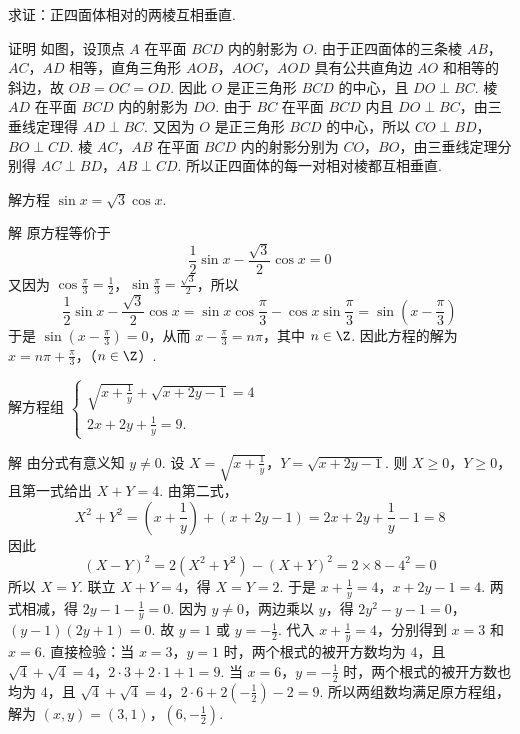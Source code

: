 \begin{problem}
求证：正四面体相对的两棱互相垂直.
\end{problem}

\begin{solution}
证明 如图，设顶点 \(A\) 在平面 \(BCD\) 内的射影为 \(O\). 由于正四面体的三条棱 \(AB\)，\(AC\)，\(AD\) 相等，直角三角形 \(AOB\)，\(AOC\)，\(AOD\) 具有公共直角边 \(AO\) 和相等的斜边，故 \(OB=OC=OD\). 因此 \(O\) 是正三角形 \(BCD\) 的中心，且 \(DO\perp BC\). 棱 \(AD\) 在平面 \(BCD\) 内的射影为 \(DO\).
由于 \(BC\) 在平面 \(BCD\) 内且 \(DO\perp BC\)，由三垂线定理得 \(AD\perp BC\). 又因为 \(O\) 是正三角形 \(BCD\) 的中心，所以 \(CO\perp BD\)，\(BO\perp CD\). 棱 \(AC\)，\(AB\) 在平面 \(BCD\) 内的射影分别为 \(CO\)，\(BO\)，由三垂线定理分别得 \(AC\perp BD\)，\(AB\perp CD\). 所以正四面体的每一对相对棱都互相垂直.
\end{solution}


\begin{problem}
解方程 \(\sin x=\sqrt{3}\cos x\).
\end{problem}

\begin{solution}
解 原方程等价于
\[
\frac{1}{2}\sin x-\frac{\sqrt{3}}{2}\cos x=0
\]
又因为 \(\cos\frac{\pi}{3}=\frac{1}{2}\)，\(\sin\frac{\pi}{3}=\frac{\sqrt{3}}{2}\)，所以
\[
\frac{1}{2}\sin x-\frac{\sqrt{3}}{2}\cos x
=\sin x\cos\frac{\pi}{3}-\cos x\sin\frac{\pi}{3}
=\sin\left(x-\frac{\pi}{3}\right)
\]
于是 \(\sin\left(x-\frac{\pi}{3}\right)=0\)，从而 \(x-\frac{\pi}{3}=n\pi\)，其中 \(n\in\Z\). 因此方程的解为
\(x=n\pi+\frac{\pi}{3}\)，（\(n\in\Z\)）.
\end{solution}

\begin{problem}
解方程组 \(\begin{cases}
\sqrt{x+\frac{1}{y}}+\sqrt{x+2y-1}=4\\
2x+2y+\frac{1}{y}=9.
\end{cases}\)
\end{problem}

\begin{solution}
解 由分式有意义知 \(y\neq0\). 设
\(X=\sqrt{x+\frac{1}{y}}\)，\(Y=\sqrt{x+2y-1}\).
则 \(X\geq0\)，\(Y\geq0\)，且第一式给出 \(X+Y=4\). 由第二式，
\[
X^{2}+Y^{2}=\left(x+\frac{1}{y}\right)+\left(x+2y-1\right)=2x+2y+\frac{1}{y}-1=8
\]
因此
\[
\left(X-Y\right)^{2}=2\left(X^{2}+Y^{2}\right)-\left(X+Y\right)^{2}=2\times8-4^{2}=0
\]
所以 \(X=Y\). 联立 \(X+Y=4\)，得 \(X=Y=2\). 于是
\(x+\frac{1}{y}=4\)，\(x+2y-1=4\).
两式相减，得 \(2y-1-\frac{1}{y}=0\). 因为 \(y\neq0\)，两边乘以 \(y\)，得
\(2y^{2}-y-1=0\)，\(\left(y-1\right)\left(2y+1\right)=0\).
故 \(y=1\) 或 \(y=-\frac{1}{2}\). 代入 \(x+\frac{1}{y}=4\)，分别得到 \(x=3\) 和 \(x=6\). 直接检验：当 \(x=3\)，\(y=1\) 时，两个根式的被开方数均为 \(4\)，且
\(\sqrt{4}+\sqrt{4}=4\)，\(2\cdot3+2\cdot1+1=9\).
当 \(x=6\)，\(y=-\frac{1}{2}\) 时，两个根式的被开方数也均为 \(4\)，且
\(\sqrt{4}+\sqrt{4}=4\)，\(2\cdot6+2\left(-\frac{1}{2}\right)-2=9\).
所以两组数均满足原方程组，解为
\(\left(x,y\right)=\left(3,1\right)\)，\(\left(6,-\frac{1}{2}\right)\).
\end{solution}

